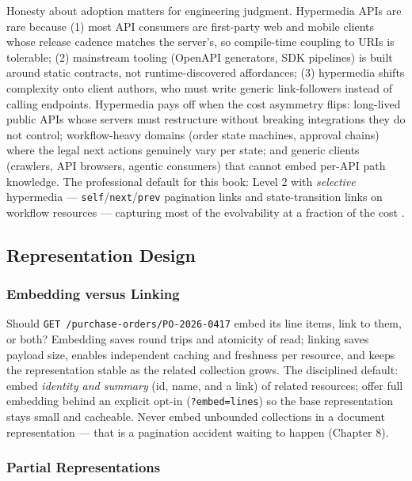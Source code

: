 Honesty about adoption matters for engineering judgment. Hypermedia APIs are
rare because (1) most API consumers are first-party web and mobile clients whose
release cadence matches the server's, so compile-time coupling to URIs is
tolerable; (2) mainstream tooling (OpenAPI generators, SDK pipelines) is built
around static contracts, not runtime-discovered affordances; (3) hypermedia
shifts complexity onto client authors, who must write generic link-followers
instead of calling endpoints. Hypermedia pays off when the cost asymmetry
flips: long-lived public APIs whose servers must restructure without breaking
integrations they do not control; workflow-heavy domains (order state machines,
approval chains) where the legal next actions genuinely vary per state; and
generic clients (crawlers, API browsers, agentic consumers) that cannot embed
per-API path knowledge. The professional default for this book: Level 2 with
\emph{selective} hypermedia --- \texttt{self}/\texttt{next}/\texttt{prev}
pagination links and state-transition links on workflow resources --- capturing
most of the evolvability at a fraction of the cost
\cite{richardson2013restful}.

\subsection{Representation Design}
\label{sec:ch3-representations}

\subsubsection{Embedding versus Linking}

Should \texttt{GET /purchase-orders/PO-2026-0417} embed its line items, link to
them, or both? Embedding saves round trips and atomicity of read; linking saves
payload size, enables independent caching and freshness per resource, and keeps
the representation stable as the related collection grows. The disciplined
default: embed \emph{identity and summary} (id, name, and a link) of related
resources; offer full embedding behind an explicit opt-in
(\texttt{?embed=lines}) so the base representation stays small and cacheable.
Never embed unbounded collections in a document representation --- that is a
pagination accident waiting to happen (Chapter 8).

\subsubsection{Partial Representations}

